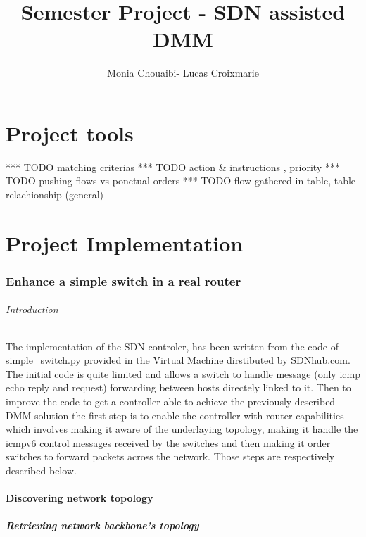 \documentclass{article}
\title{Semester Project - SDN assisted DMM }
\author{Monia Chouaibi- Lucas Croixmarie}
\begin{document}
\maketitle

\part{Project tools}

*** TODO matching criterias
*** TODO action & instructions , priority 
*** TODO pushing flows vs ponctual orders 
*** TODO flow gathered in table, table relachionship (general)
    

\part{Project Implementation}

\section{Enhance a simple switch in a real router}

\paragraph{Introduction}
The implementation of the SDN controler, has been written from the
code of simple\_switch.py provided in the Virtual Machine dirstibuted
by SDNhub.com. The initial code is quite limited and allows a switch
to handle message (only icmp echo reply and request) forwarding between
hosts directely linked to it. Then to improve the code to get a
controller able to achieve the previously described DMM solution the
first step is to enable the controller with router capabilities which
involves making it aware of the underlaying topology, making it handle
the icmpv6 control messages received by the switches and then making
it order switches to forward packets across the network. Those steps
are respectively described below.

\subsection{Discovering network topology}

\subsubsection{Retrieving network backbone's topology}
\end{document}
